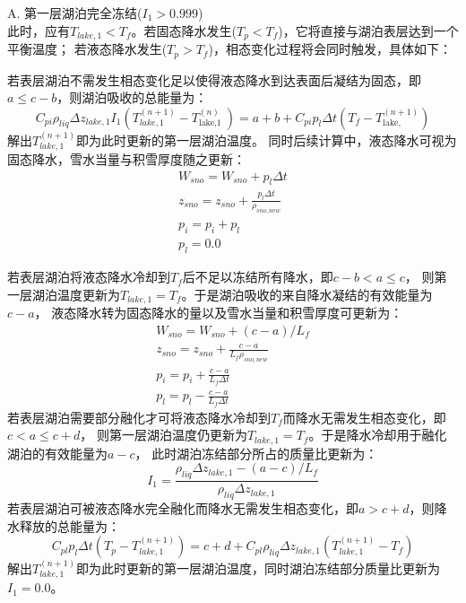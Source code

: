 A. 第一层湖泊完全冻结($I_1>0.999$)\\
此时，应有$T_{lake,1}<T_f$。若固态降水发生($T_p<T_f$)，它将直接与湖泊表层达到一个平衡温度；
若液态降水发生($T_p>T_f$)，相态变化过程将会同时触发，具体如下：

若表层湖泊不需发生相态变化足以使得液态降水到达表面后凝结为固态，即$a\le c-b$，则湖泊吸收的总能量为：
\begin{equation}
C_{pi} \rho_{liq} \Delta z_{lake,1} I_{1}\left(T_{lake, 1}^{(n+1)}-T_{\text {lake,1 }}^{(n)}\right)=a+b+C_{pi} p_{l} \Delta t\left(T_{f}-T_{\text {lake, }}^{(n+1)}\right)
\end{equation}
解出$T_{lake,1}^{\left(n+1\right)}$即为此时更新的第一层湖泊温度。
同时后续计算中，液态降水可视为固态降水，雪水当量与积雪厚度随之更新：
\begin{equation}
\begin{array}{c}W_{sno}=W_{sno}+p_{l} \Delta t \\ z_{sno}=z_{sno}+\frac{p_{l} \Delta t}{\rho_{sno,new}} \\ p_{i}=p_{i}+p_{l} \\ p_{l}=0.0\end{array}
\end{equation}


若表层湖泊将液态降水冷却到$T_f$后不足以冻结所有降水，即$c-b<a\le c$，
则第一层湖泊温度更新为$T_{lake,1}=T_f$。于是湖泊吸收的来自降水凝结的有效能量为$c-a$，
液态降水转为固态降水的量以及雪水当量和积雪厚度可更新为：
\begin{equation}
\begin{array}{c}W_{sno}=W_{sno}+(c-a) / L_{f} \\ z_{sno}=z_{sno}+\frac{c-a}{L_{f} \rho_{sno,new}} \\ p_{i}=p_{i}+\frac{c-a}{L_{f} \Delta t} \\ p_{l}=p_{l}-\frac{c-a}{L_{f} \Delta t}\end{array}
\end{equation}
若表层湖泊需要部分融化才可将液态降水冷却到$T_f$而降水无需发生相态变化，即$c<a\le c+d$，
则第一层湖泊温度仍更新为$T_{lake,1}=T_f$。于是降水冷却用于融化湖泊的有效能量为$a-c$，
此时湖泊冻结部分所占的质量比更新为：
\begin{equation}
I_{1}=\frac{\rho_{liq} \Delta z_{lake, 1}-(a-c) / L_{f}}{\rho_{liq} \Delta z_{lake, 1}}
\end{equation}
若表层湖泊可被液态降水完全融化而降水无需发生相态变化，即$a>c+d$，则降水释放的总能量为：
\begin{equation}
C_{pl} p_{l} \Delta t\left(T_{p}-T_{lake, 1}^{(n+1)}\right)=c+d+C_{pl} \rho_{liq} \Delta z_{lake, 1}\left(T_{lake, 1}^{(n+1)}-T_{f}\right)
\end{equation}
解出$T_{lake,1}^{\left(n+1\right)}$即为此时更新的第一层湖泊温度，同时湖泊冻结部分质量比更新为$I_1=0.0$。


